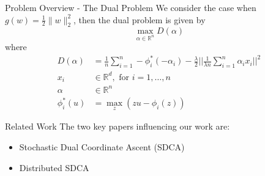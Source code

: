 \documentclass{beamer}
\def \R {\mathbb{R}}
\def \R {\mathbb{R}}
\begin{document}
\begin{frame}{Problem Overview - The Dual Problem}
  We consider the case when $g(w)=\frac{1}{2}\|w\|_2^2$, then the dual problem is given by
  \vspace{1em}
  \begin{equation}
    \max_{\alpha \in \R^n} D(\alpha)
  \end{equation}
  where 
  \begin{align*}
    D(\alpha) &= \frac{1}{n}\sum_{i=1}^n -\phi^*_i(-\alpha_i) -
    \frac{\lambda}{2}\Big|\Big|\frac{1}{\lambda n}\sum_{i=1}^n\alpha_i x_i\Big|\Big|^2\\
    x_i & \in \R^d, \text{ for } i = 1, \dots, n\\
    \alpha & \in \R^n\\
    \phi^*_i(u) &= \max_z (zu - \phi_i(z))
  \end{align*}
\end{frame}
%
\begin{frame}{Related Work}
  The two key papers influencing our work are:
	\begin{itemize}
	  \item  Stochastic Dual Coordinate Ascent (SDCA) \cite{shalev2013stochastic}
	  \item Distributed SDCA  \cite{yang2013trading,yang2013analysis}
	\end{itemize}
\end{frame}
\end{document}
